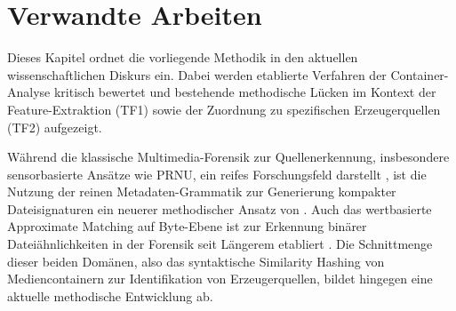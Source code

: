 \chapter{Verwandte Arbeiten}
\label{sec:relatedwork}

Dieses Kapitel ordnet die vorliegende Methodik in den aktuellen wissenschaftlichen Diskurs ein. Dabei werden etablierte Verfahren der Container-Analyse kritisch bewertet und bestehende methodische Lücken im Kontext der Feature-Extraktion (TF1) sowie der Zuordnung zu spezifischen Erzeugerquellen (TF2) aufgezeigt.

Während die klassische Multimedia-Forensik zur Quellenerkennung, insbesondere sensorbasierte Ansätze wie PRNU, ein reifes Forschungsfeld darstellt \cite{lukas_digital_2006}, ist die Nutzung der reinen Metadaten-Grammatik zur Generierung kompakter Dateisignaturen ein neuerer methodischer Ansatz von \citeauthor{klier_media_2025} \cite{klier_media_2025}. Auch das wertbasierte Approximate Matching auf Byte-Ebene ist zur Erkennung binärer Dateiähnlichkeiten in der Forensik seit Längerem etabliert \cite{roussev_data_2010}. Die Schnittmenge dieser beiden Domänen, also das syntaktische Similarity Hashing von Mediencontainern zur Identifikation von Erzeugerquellen, bildet hingegen eine aktuelle methodische Entwicklung ab.



